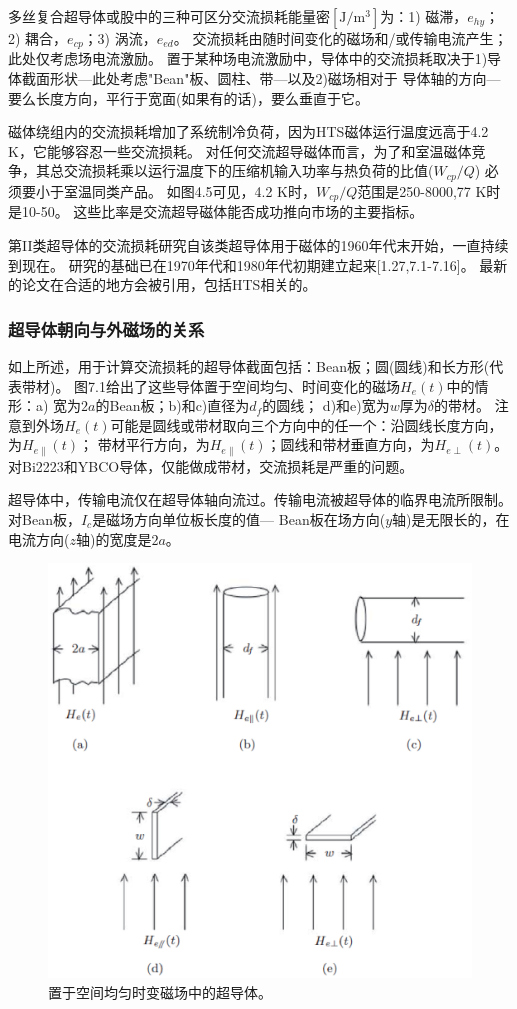 多丝复合超导体或股中的三种可区分交流损耗能量密$[\mathrm{J/m^3}]$为：1) 磁滞，$e_{hy}$；
2) 耦合，$e_{cp}$；3) 涡流，$e_{ed}$。
交流损耗由随时间变化的磁场和/或传输电流产生；此处仅考虑场电流激励。
置于某种场电流激励中，导体中的交流损耗取决于1)导体截面形状---此处考虑"Bean"板、圆柱、带---以及2)磁场相对于
导体轴的方向---要么长度方向，平行于宽面(如果有的话)，要么垂直于它。

磁体绕组内的交流损耗增加了系统制冷负荷，因为HTS磁体运行温度远高于4.2 K，它能够容忍一些交流损耗。
对任何交流超导磁体而言，为了和室温磁体竞争，其总交流损耗乘以运行温度下的压缩机输入功率与热负荷的比值($W_{cp}/Q$)
必须要小于室温同类产品。
如图4.5可见，4.2 K时，$W_{cp}/Q$范围是250-8000,77 K时是10-50。
这些比率是交流超导磁体能否成功推向市场的主要指标。

第II类超导体的交流损耗研究自该类超导体用于磁体的1960年代末开始，一直持续到现在。
研究的基础已在1970年代和1980年代初期建立起来[1.27,7.1-7.16]。
最新的论文在合适的地方会被引用，包括HTS相关的。

\subsubsection*{超导体朝向与外磁场的关系}
如上所述，用于计算交流损耗的超导体截面包括：Bean板；圆(圆线)和长方形(代表带材)。
图7.1给出了这些导体置于空间均匀、时间变化的磁场$H_e(t)$中的情形：a) 宽为$2a$的Bean板；b)和c)直径为$d_f$的圆线；
d)和e)宽为$w$厚为$\delta$的带材。
注意到外场$H_e(t)$可能是圆线或带材取向三个方向中的任一个：沿圆线长度方向，为$H_{e\parallel}(t)$；
带材平行方向，为$H_{e\parallel}(t)$；圆线和带材垂直方向，为$H_{e\perp}(t)$。
对Bi2223和YBCO导体，仅能做成带材，交流损耗是严重的问题。

超导体中，传输电流仅在超导体轴向流过。传输电流被超导体的临界电流所限制。对Bean板，$I_c$是磁场方向单位板长度的值---
Bean板在场方向($y$轴)是无限长的，在电流方向($z$轴)的宽度是$2a$。
\begin{figure}[htbp]
	\centering
	\includegraphics[scale=0.6]{chpt7/figs/fig7.1.eps}
	\caption{置于空间均匀时变磁场中的超导体。}
\end{figure}

